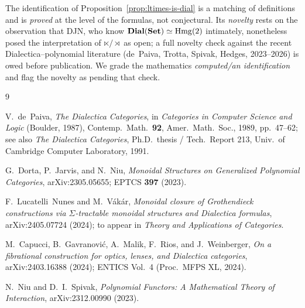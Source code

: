\begin{Remark}[Grade]
\label{rem:dia-grade}
The identification of Proposition~\ref{prop:ltimes-is-dial} is a matching of
definitions and is \emph{proved} at the level of the formulas, not conjectural.
Its \emph{novelty} rests on the observation that DJN, who know
$\mathbf{Dial}(\mathbf{Set})\simeq\mathrm{Hmg}(2)$ intimately, nonetheless posed the interpretation of
$\ltimes/\rtimes$ as open; a full novelty check against the recent
Dialectica--polynomial literature (de~Paiva, Trotta, Spivak, Hedges, 2023--2026)
is owed before publication. We grade the mathematics \emph{computed/an
identification} and flag the novelty as pending that check.
\end{Remark}

\begin{thebibliography}{9}

V.~de~Paiva,
\emph{The Dialectica Categories},
in \emph{Categories in Computer Science and Logic} (Boulder, 1987),
Contemp.\ Math.\ \textbf{92}, Amer.\ Math.\ Soc., 1989, pp.~47--62;
see also \emph{The Dialectica Categories}, Ph.D.\ thesis / Tech.\ Report
213, Univ.\ of Cambridge Computer Laboratory, 1991.

G.~Dorta, P.~Jarvis, and N.~Niu,
\emph{Monoidal Structures on Generalized Polynomial Categories},
arXiv:2305.05655; EPTCS \textbf{397} (2023).

F.~Lucatelli~Nunes and M.~Vákár,
\emph{Monoidal closure of Grothendieck constructions via $\Sigma$-tractable
monoidal structures and Dialectica formulas},
arXiv:2405.07724 (2024); to appear in \emph{Theory and Applications of
Categories}.

M.~Capucci, B.~Gavranović, A.~Malik, F.~Rios, and J.~Weinberger,
\emph{On a fibrational construction for optics, lenses, and Dialectica
categories},
arXiv:2403.16388 (2024); ENTICS Vol.\ 4 (Proc.\ MFPS XL, 2024).

N.~Niu and D.~I.~Spivak,
\emph{Polynomial Functors: A Mathematical Theory of Interaction},
arXiv:2312.00990 (2023).

\end{thebibliography}


